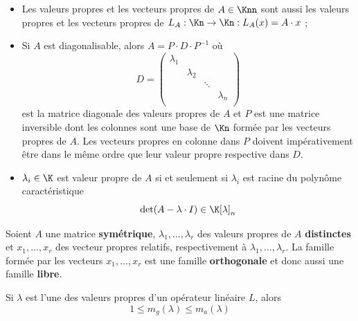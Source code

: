 \begin{myrem}
	\InsertTheoremBreak
	\begin{itemize}
		\item Les valeurs propres et les vecteurs propres de $A \in \Knn$ sont aussi les valeurs propres et les vecteurs propres de $L_A : \Kn \rightarrow \Kn : L_A(x) = A \cdot x$ ;
		\item Si $A$ est diagonalisable, alors
			$A = P\cdot D \cdot P^{-1}$ où
			\[
			D = \begin{pmatrix} \lambda_1 &  &  &  \\
				& \lambda_2 &  & \\
				& & \ddots & \\
				& & & \lambda_n \\
			\end{pmatrix}
			\]
			est la matrice diagonale des valeurs propres de $A$
			et $P$ est une matrice inversible dont les colonnes sont une base de $\Kn$ formée par les vecteurs propres de $A$.
			Les vecteurs propres en colonne dans $P$ doivent impérativement être dans le même ordre que leur valeur propre respective dans $D$.
		\item $\lambda_i \in \K$ est valeur propre de $A$ si et seulement si $\lambda_i$ est racine du polynôme caractéristique
			\[ \newdet (A - \lambda \cdot I) \in \K[\lambda]_n \]
	\end{itemize}
\end{myrem}

\begin{myprop}
	Soient $A$ une matrice \textbf{symétrique},
	$\lambda_1, \dots, \lambda_r$ des valeurs propres de $A$ \textbf{distinctes}
	et $x_1, \dots, x_r$ des vecteur propres relatifs, respectivement à $\lambda_1, \dots, \lambda_r$.
	La famille formée par les vecteurs $x_1, \dots, x_r$ est une famille \textbf{orthogonale} et donc aussi une famille \textbf{libre}.
\end{myprop}

\begin{myprop}[Multiplicité]
	Si $\lambda$ est l'une des valeurs propres d'un opérateur linéaire $L$, alors
	\[ 1 \leq m_g (\lambda) \leq m_a (\lambda) \]
\end{myprop}

